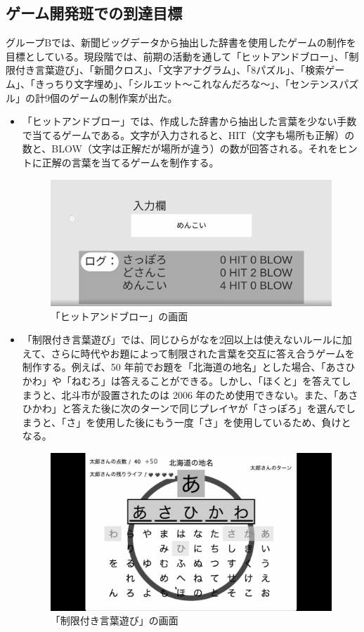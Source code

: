 \subsection{ゲーム開発班での到達目標}
グループBでは、新聞ビッグデータから抽出した辞書を使用したゲームの制作を目標としている。現段階では、前期の活動を通して「ヒットアンドブロー」、「制限付き言葉遊び」、「新聞クロス」、「文字アナグラム」、「8パズル」、「検索ゲーム」、「きっちり文字埋め」、「シルエット～これなんだろな～」、「センテンスパズル」の計9個のゲームの制作案が出た。
\begin{itemize}
    \item 「ヒットアンドブロー」では、作成した辞書から抽出した言葉を少ない手数で当てるゲームである。文字が入力されると、HIT（文字も場所も正解）の数と、BLOW（文字は正解だが場所が違う）の数が回答される。それをヒントに正解の言葉を当てるゲームを制作する。
\begin{figure}[htbp]
    \centering
    \includegraphics[keepaspectratio, scale=0.3]{images/Project_picuture2.png}
    \caption{「ヒットアンドブロー」の画面}
    \label{fig:my_label}
\end{figure}
\newpage
    \item 「制限付き言葉遊び」では、同じひらがなを2回以上は使えないルールに加えて、さらに時代やお題によって制限された言葉を交互に答え合うゲームを制作する。例えば、50 年前でお題を「北海道の地名」とした場合、「あさひかわ」や「ねむろ」は答えることができる。しかし、「ほくと」を答えてしまうと、北斗市が設置されたのは 2006 年のため使用できない。また、「あさひかわ」と答えた後に次のターンで同じプレイヤが「さっぽろ」を選んでしまうと、「さ」を使用した後にもう一度「さ」を使用しているため、負けとなる。
\begin{figure}[htbp]
    \centering
    \includegraphics[keepaspectratio, scale=0.2]{images/Project_picuture1.png}
    \caption{「制限付き言葉遊び」の画面}
    \label{fig:my_label}
\end{figure}


\end{itemize}
